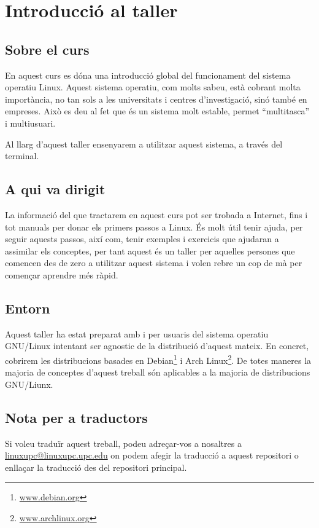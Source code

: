 \section{Introducció al taller}

\subsection{Sobre el curs}

\par
En aquest curs es dóna una introducció global del funcionament del sistema operatiu Linux.
Aquest sistema operatiu, com molts sabeu, està cobrant molta importància, no tan sols a les universitats i centres d'investigació, sinó també en empreses.
Això es deu al fet que és un sistema molt estable, permet ``multitasca'' i multiusuari.
\par
Al llarg d'aquest taller ensenyarem a utilitzar aquest sistema, a través del terminal.

\subsection{A qui va dirigit}

\par
La informació del que tractarem en aquest curs pot ser trobada a Internet, fins i tot manuals per donar els primers passos a Linux.
És molt útil tenir ajuda, per seguir aquests passos, així com, tenir exemples i exercicis que ajudaran a assimilar els conceptes, per tant aquest és un taller per aquelles persones que comencen des de zero a utilitzar aquest sistema i volen rebre un cop de mà per començar aprendre més ràpid.

\subsection{Entorn}

\par
Aquest taller ha estat preparat amb i per usuaris del sistema operatiu GNU/Linux intentant
ser agnostic de la distribució d'aquest mateix. En concret, cobrirem les distribucions basades
en Debian\footnote{\url{www.debian.org}} i Arch Linux\footnote{\url{www.archlinux.org}}. 
De totes maneres la majoria de conceptes d'aquest treball són aplicables a la majoria de
distribucions GNU/Liunx.

\subsection{Nota per a traductors}

\par
Si voleu traduïr aquest treball, podeu adreçar-vos a nosaltres a \href{mailto:linuxupc@linuxupc.upc.edu}{linuxupc@linuxupc.upc.edu}
on podem afegir la traducció a aquest repositori o enllaçar la traducció des del repositori principal.
